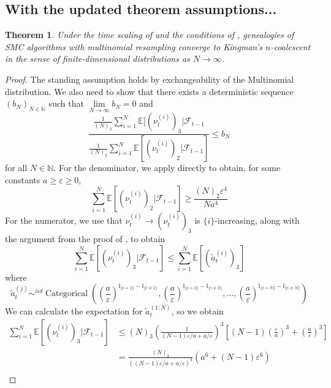 \documentclass[fleqn]{article}
\newtheorem{thm}{Theorem}
\theoremstyle{definition}
\newcommand{\N}{\mathbb{N}}
\newcommand{\E}{\mathbb{E}}
\newcommand{\I}[1]{\mathbb{I}_{\{#1\}}}
\newcommand{\limNtoinfty}{\underset{N\to\infty}{\lim}}
\newcommand{\Cat}{\operatorname{Categorical}}
\newcommand{\F}{\mathcal{F}_{t-1}}
\newcommand{\vt}[2][t]{\nu_{#1}^{(#2)}}
\begin{document}
\subsection{With the updated theorem assumptions...}
\begin{thm}\label{thm:mn_newassns}
Under the time scaling of \citet[Theorem 1]{koskela2018} and the conditions of \citet[Lemma 3]{koskela2018}, genealogies of SMC algorithms with multinomial resampling converge to Kingman's $n$-coalescent in the sense of finite-dimensional distributions as $N\to\infty$.
\end{thm}

\begin{proof}
The standing assumption holds by exchangeability of the Multinomial distribution.
We also need to show that there exists a deterministic sequence $(b_N)_{N\in\N}$ such that $\limNtoinfty b_N =0$ and
\begin{equation}\label{eq:csmc_ratiobound}
\frac{\frac{1}{(N)_3}{\sum_{i=1}^N \E[(\vt{i})_3 |\F}}{\frac{1}{(N)_2} \sum_{i=1}^N \E[(\vt{i})_2 |\F]} \leq b_N
\end{equation}
for all $N \in \N$. 
For the denominator, we apply \citet[Lemma 3]{koskela2018} directly to obtain, for some constants $a\geq \varepsilon\geq0$,
\begin{equation*}
\sum_{i=1}^N \E[(\vt{i})_2 |\F] \geq \frac{(N)_2 \varepsilon^4}{Na^4}
\end{equation*}
For the numerator, we use that $\vt{i} \longrightarrow (\vt{i})_3$ is $\{i\}$-increasing, along with the argument from the proof of \citet[Lemma 3]{koskela2018}, to obtain
\begin{equation*}
\sum_{i=1}^N \E[(\vt{i})_3 |\F] \leq \sum_{i=1}^N  \E[(\tilde{a}_t^{(i)})_3]
\end{equation*}
where
\begin{equation}
\tilde{a}_t^{(j)} \sim^{iid} \Cat \left( \left(\frac{a}{\varepsilon}\right)^{\I{i=1}-\I{i\neq 1}}, \left(\frac{a}{\varepsilon}\right)^{\I{i=2}-\I{i\neq 2}}, \dots, \left(\frac{a}{\varepsilon}\right)^{\I{i=N}-\I{i\neq N}} \right)
\end{equation}
We can calculate the expectation for $\tilde{a}_t^{(1:N)}$, so we obtain
\begin{align*}
\sum_{i=1}^N \E[(\vt{i})_3 |\F] &\leq 
(N)_3 \left( \frac{1}{(N-1)\varepsilon/a + a/\varepsilon} \right)^3 \left[ (N-1)\left(\frac{\varepsilon}{a}\right)^3 + \left(\frac{a}{\varepsilon}\right)^3 \right] \\
&= \frac{(N)_3}{\left((N-1)\varepsilon/a + a/\varepsilon\right)^3}\left(a^6 + (N-1)\varepsilon^6\right) \\

\end{align*}
\end{proof}
\end{document}
